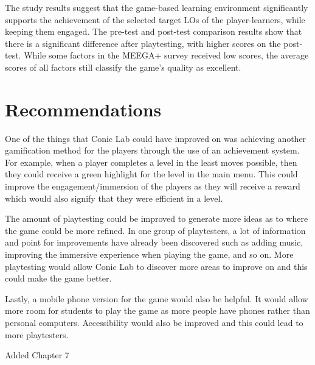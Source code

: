The study results suggest that the game-based learning environment significantly supports the achievement of the selected target LOs of the player-learners, while keeping them engaged. The pre-test and post-test comparison results show that there is a significant difference after playtesting, with higher scores on the post-test. While some factors in the MEEGA+ survey received low scores, the average scores of all factors still classify the game's quality as excellent.

\section{Recommendations}
\label{sec:recommendations}
One of the things that Conic Lab could have improved on was achieving another gamification method for the players through the use of an achievement system. For example, when a player completes a level in the least moves possible, then they could receive a green highlight for the level in the main menu. This could improve the engagement/immersion of the players as they will receive a reward which would also signify that they were efficient in a level. 

The amount of playtesting could be improved to generate more ideas as to where the game could be more refined. In one group of playtesters, a lot of information and point for improvements have already been discovered such as adding music, improving the immersive experience when playing the game, and so on. More playtesting would allow Conic Lab to discover more areas to improve on and this could make the game better.

Lastly, a mobile phone version for the game would also be helpful. It would allow more room for students to play the game as more people have phones rather than personal computers. Accessibility would also be improved and this could lead to more playtesters.

Added Chapter 7





